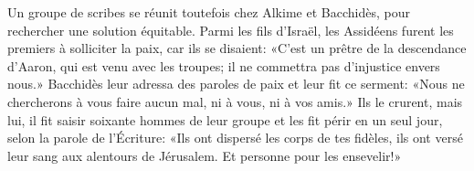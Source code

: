 Un groupe de scribes se réunit toutefois chez Alkime et Bacchidès,
	pour rechercher une solution équitable.
Parmi les fils d’Israël, les Assidéens furent les premiers à solliciter la paix,
	car ils se disaient:
	«C’est un prêtre de la descendance d’Aaron, qui est venu avec les troupes;
	il ne commettra pas d’injustice envers nous.»
Bacchidès leur adressa des paroles de paix et leur fit ce serment:
	«Nous ne chercherons à vous faire aucun mal, ni à vous, ni à vos amis.»
Ils le crurent, mais lui, il fit saisir soixante hommes de leur groupe
		et les fit périr en un seul jour,
	selon la parole de l’Écriture:
	«Ils ont dispersé les corps de tes fidèles,
	ils ont versé leur sang aux alentours de Jérusalem.
	Et personne pour les ensevelir!»
